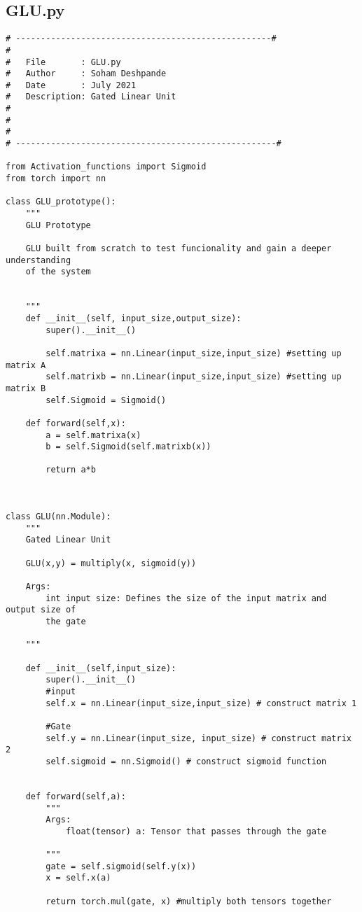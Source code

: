 \documentclass{article}
\begin{document}
\clearpage

\subsection{GLU.py}
\begin{lstlisting}
# ---------------------------------------------------#
#
#   File       : GLU.py
#   Author     : Soham Deshpande
#   Date       : July 2021
#   Description: Gated Linear Unit
#
#
#
# ----------------------------------------------------#

from Activation_functions import Sigmoid
from torch import nn

class GLU_prototype():
    """
    GLU Prototype

    GLU built from scratch to test funcionality and gain a deeper understanding
    of the system


    """
    def __init__(self, input_size,output_size):
        super().__init__()

        self.matrixa = nn.Linear(input_size,input_size) #setting up matrix A
        self.matrixb = nn.Linear(input_size,input_size) #setting up matrix B
        self.Sigmoid = Sigmoid()

    def forward(self,x):
        a = self.matrixa(x)
        b = self.Sigmoid(self.matrixb(x))

        return a*b



class GLU(nn.Module):
    """
    Gated Linear Unit

    GLU(x,y) = multiply(x, sigmoid(y))

    Args:
        int input size: Defines the size of the input matrix and output size of
        the gate

    """

    def __init__(self,input_size):
        super().__init__()
        #input
        self.x = nn.Linear(input_size,input_size) # construct matrix 1

        #Gate
        self.y = nn.Linear(input_size, input_size) # construct matrix 2
        self.sigmoid = nn.Sigmoid() # construct sigmoid function


    def forward(self,a):
        """
        Args:
            float(tensor) a: Tensor that passes through the gate

        """
        gate = self.sigmoid(self.y(x))
        x = self.x(a)

        return torch.mul(gate, x) #multiply both tensors together






\end{lstlisting}
\clearpage
\end{document}
